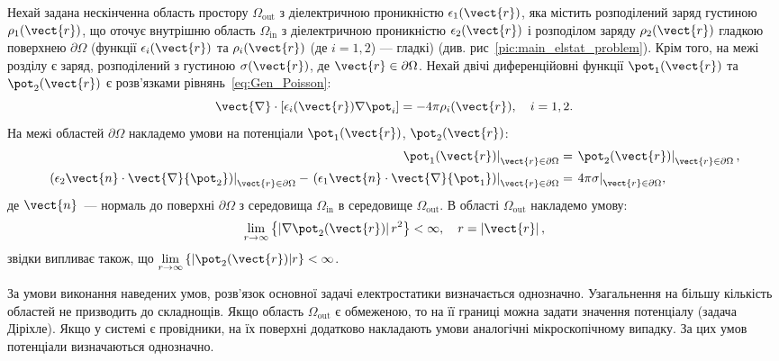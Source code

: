 \begin{Theory}
	Нехай задана нескінченна область простору $\Omega_\text{out}$ з діелектричною проникністю $\epsilon_1(\vect{r})$, яка містить розподілений заряд густиною $\rho_1(\vect{r})$, що оточує внутрішню область $\Omega_\text{in}$ з діелектричною проникністю $\epsilon_2(\vect{r})$ і розподілом заряду $\rho_2(\vect{r})$ гладкою поверхнею $\partial\Omega$ (функції $\epsilon_i(\vect{r})$ та $\rho_i(\vect{r})$ (де $i= 1,2$) --- гладкі) (див. рис~\ref{pic:main_elstat_problem}). Крім того, на межі розділу є заряд, розподілений з густиною $\sigma(\vect{r})$, де $\vect{r} \in \partial\Omega$. Нехай двічі диференційовні функції $\pot_1(\vect{r})$ та $\pot_2(\vect{r})$  є розв'язками рівнянь~\eqref{eq:Gen_Poisson}:
	\begin{equation}\label{eq:Gen_Poisson1}
		\vect{\nabla} \cdot \left[ {\epsilon_i(\vect{r})\nabla {\pot_i}} \right] =  - 4\pi \rho_i(\vect{r}), \quad i =1,2.
	\end{equation}
	На межі областей $\partial\Omega$  накладемо умови на потенціали $\pot_1(\vect{r})$, $\pot_2(\vect{r})$:
	\begin{align}
		\left. \pot_1(\vect{r})\right|_{\vect{r}\in\partial\Omega}                                                                                                                                                                                              & =  \left.\pot_2(\vect{r})\right|_{\vect{r}\in\partial\Omega},        \\
		{\left. {\left( {{\epsilon _2}{\vect{n}} \cdot \vect{\nabla} {\pot_2}} \right)} \right|_{{\vect{r}} \in \partial \Omega }} - {\left. {\left( {{\epsilon _1}{\vect{n}} \cdot \vect{\nabla} {\pot_1}} \right)} \right|_{{\vect{r}} \in \partial \Omega }} & = {\left. {4\pi \sigma } \right|_{{\vect{r}} \in \partial \Omega }},
	\end{align}
	де $\vect{n}$~--- нормаль до поверхні $\partial\Omega$  з середовища $\Omega_\text{in}$   в середовище  $\Omega_\text{out}$.
	В області  $\Omega_\text{out}$ накладемо умову:
	\begin{equation}\label{}
		\lim\limits_{r \to \infty } \left\{ {\left| {\nabla {\pot _2}({\vect{r}})} \right|{r^2}} \right\} < \infty ,\quad r = \left| {\vect{r}} \right|,
	\end{equation}
	звідки випливає також, що $\lim\limits_{r \to \infty } \left\{ | \pot _2(\vect{r}) |r \right\} < \infty$.

	За умови виконання наведених умов,  розв'язок основної задачі електростатики визначається однозначно. Узагальнення на більшу кількість областей не призводить до складнощів. Якщо область $\Omega_\text{out}$ є обмеженою, то на її границі можна задати значення потенціалу (задача Діріхле). Якщо у системі є провідники, на їх поверхні додатково накладають умови аналогічні  мікроскопічному випадку.  За цих умов потенціали визначаються однозначно. 
\end{Theory}

